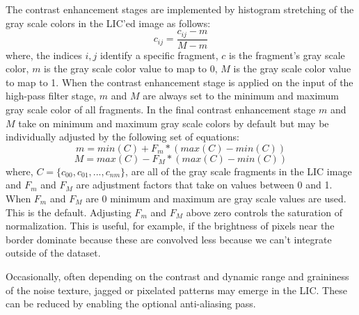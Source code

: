 \documentclass[a4paper,10pt]{article}
\begin{document}
The contrast enhancement stages are implemented by histogram stretching of the gray scale colors in the LIC'ed image as follows:
\begin{equation}
c_{ij} = \frac{c_{ij} - m}{M - m}
\end{equation}
where, the indices $i,j$ identify a specific fragment, $c$ is the fragment's gray scale color, $m$ is the gray scale color value to map to 0, $M$ is the gray scale color value to map to 1. When the contrast enhancement stage is applied on the input of the high-pass filter stage, $m$ and $M$ are always set to the minimum and maximum gray scale color of all fragments. In the final contrast enhancement stage $m$ and $M$ take on minimum and maximum gray scale colors by default but may be individually adjusted by the following set of equations:
\begin{equation}
m = min(C) + F_{m} * ( max(C) - min(C) )
\end{equation}
\begin{equation}
M = max(C) - F_{M} * ( max(C) - min(C) ) 
\end{equation}
where, $C = \{c_{00},c_{01},...,c_{nm}\}$, are all of the gray scale fragments in the LIC image and $F_m$ and $F_M$ are adjustment factors that take on values between 0 and 1. When $F_m$ and $F_M$ are 0 minimum and maximum are gray scale values are used. This is the default. Adjusting $F_m$ and $F_M$ above zero controls the saturation of normalization. This is useful, for example, if the brightness of pixels near the border dominate because these are convolved less because we can't integrate outside of the dataset.

Occasionally, often depending on the contrast and dynamic range and graininess of the noise texture, jagged or pixelated patterns may emerge in the LIC. These can be reduced by enabling the optional anti-aliasing pass.
\end{document}
